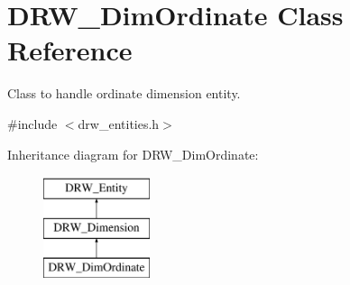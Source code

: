 \hypertarget{classDRW__DimOrdinate}{\section{D\-R\-W\-\_\-\-Dim\-Ordinate Class Reference}
\label{classDRW__DimOrdinate}
}


Class to handle ordinate dimension entity.  




{\ttfamily \#include $<$drw\-\_\-entities.\-h$>$}

Inheritance diagram for D\-R\-W\-\_\-\-Dim\-Ordinate\-:\begin{figure}[H]
\begin{center}
\leavevmode
\includegraphics[height=3.000000cm]{classDRW__DimOrdinate}
\end{center}
\end{figure}
